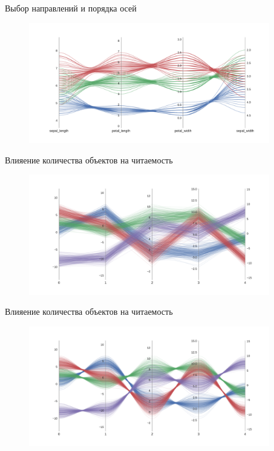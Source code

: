 \documentclass[fleqn, xcolor=x11names]{beamer}
\begin{document}
\begin{frame}{Выбор направлений и порядка осей}
    \begin{figure}[htb]
        \centering
        \includegraphics[width=10.5cm]{upgrade_4.pdf}
    \end{figure}
\end{frame}

\begin{frame}{Влияение количества объектов на читаемость}
    \begin{figure}[htb]
        \centering
        \includegraphics[width=10.5cm]{base_good_clustering.pdf}
    \end{figure}
\end{frame}

\begin{frame}{Влияение количества объектов на читаемость}
    \begin{figure}[htb]
        \centering
        \includegraphics[width=10.5cm]{good_clustering.pdf}
    \end{figure}
\end{frame}
\end{document}
